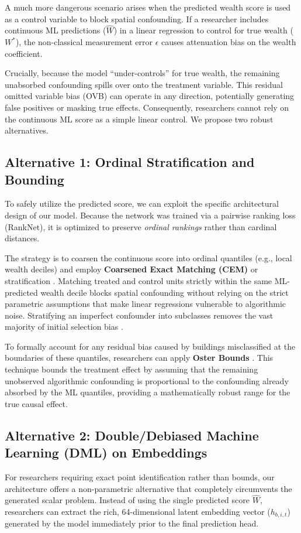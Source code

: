 \documentclass[11pt]{article}
\begin{document}
A much more dangerous scenario arises when the predicted wealth score is used as a control variable to block spatial confounding. If a researcher includes continuous ML predictions ($\hat{W}$) in a linear regression to control for true wealth ($W^*$), the non-classical measurement error $\epsilon$ causes attenuation bias on the wealth coefficient. 

Crucially, because the model ``under-controls'' for true wealth, the remaining unabsorbed confounding spills over onto the treatment variable. This residual omitted variable bias (OVB) can operate in any direction, potentially generating false positives or masking true effects. Consequently, researchers cannot rely on the continuous ML score as a simple linear control. We propose two robust alternatives.

\subsection*{Alternative 1: Ordinal Stratification and Bounding}
To safely utilize the predicted score, we can exploit the specific architectural design of our model. Because the network was trained via a pairwise ranking loss (RankNet), it is optimized to preserve \textit{ordinal rankings} rather than cardinal distances. 

The strategy is to coarsen the continuous score into ordinal quantiles (e.g., local wealth deciles) and employ \textbf{Coarsened Exact Matching (CEM)} or stratification \citep{iacus2012causal}. Matching treated and control units strictly within the same ML-predicted wealth decile blocks spatial confounding without relying on the strict parametric assumptions that make linear regressions vulnerable to algorithmic noise. Stratifying an imperfect confounder into subclasses removes the vast majority of initial selection bias \citep{cochran1968effectiveness}. 

To formally account for any residual bias caused by buildings misclassified at the boundaries of these quantiles, researchers can apply \textbf{Oster Bounds} \citep{oster2019unobservable}. This technique bounds the treatment effect by assuming that the remaining unobserved algorithmic confounding is proportional to the confounding already absorbed by the ML quantiles, providing a mathematically robust range for the true causal effect.

\subsection*{Alternative 2: Double/Debiased Machine Learning (DML) on Embeddings}
For researchers requiring exact point identification rather than bounds, our architecture offers a non-parametric alternative that completely circumvents the generated scalar problem. Instead of using the single predicted score $\hat{W}$, researchers can extract the rich, 64-dimensional latent embedding vector ($h_{b,i,t}$) generated by the model immediately prior to the final prediction head.
\end{document}
